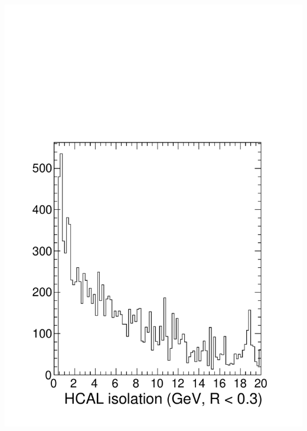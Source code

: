 \documentclass[compress]{beamer}
\begin{document}
\begin{frame}
\begin{columns}
\includegraphics[width=\linewidth]{hcaliso_background.pdf}
\end{columns}
\end{frame}
\end{document}
